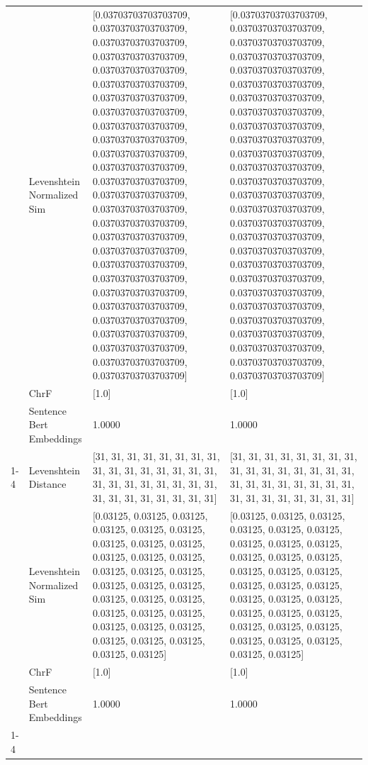 \begin{tabular}{llll}
 & Levenshtein Normalized Sim & [0.03703703703703709, 0.03703703703703709, 0.03703703703703709, 0.03703703703703709, 0.03703703703703709, 0.03703703703703709, 0.03703703703703709, 0.03703703703703709, 0.03703703703703709, 0.03703703703703709, 0.03703703703703709, 0.03703703703703709, 0.03703703703703709, 0.03703703703703709, 0.03703703703703709, 0.03703703703703709, 0.03703703703703709, 0.03703703703703709, 0.03703703703703709, 0.03703703703703709, 0.03703703703703709, 0.03703703703703709, 0.03703703703703709, 0.03703703703703709, 0.03703703703703709, 0.03703703703703709, 0.03703703703703709] & [0.03703703703703709, 0.03703703703703709, 0.03703703703703709, 0.03703703703703709, 0.03703703703703709, 0.03703703703703709, 0.03703703703703709, 0.03703703703703709, 0.03703703703703709, 0.03703703703703709, 0.03703703703703709, 0.03703703703703709, 0.03703703703703709, 0.03703703703703709, 0.03703703703703709, 0.03703703703703709, 0.03703703703703709, 0.03703703703703709, 0.03703703703703709, 0.03703703703703709, 0.03703703703703709, 0.03703703703703709, 0.03703703703703709, 0.03703703703703709, 0.03703703703703709, 0.03703703703703709, 0.03703703703703709] \\
 & ChrF & [1.0] & [1.0] \\
 & Sentence Bert Embeddings & 1.0000 & 1.0000 \\
\cline{1-4}
\multirow[t]{4}{*}{Getaracha nigo gekoiyia amoro ye'nyomba.} & Levenshtein Distance & [31, 31, 31, 31, 31, 31, 31, 31, 31, 31, 31, 31, 31, 31, 31, 31, 31, 31, 31, 31, 31, 31, 31, 31, 31, 31, 31, 31, 31, 31, 31, 31] & [31, 31, 31, 31, 31, 31, 31, 31, 31, 31, 31, 31, 31, 31, 31, 31, 31, 31, 31, 31, 31, 31, 31, 31, 31, 31, 31, 31, 31, 31, 31, 31] \\
 & Levenshtein Normalized Sim & [0.03125, 0.03125, 0.03125, 0.03125, 0.03125, 0.03125, 0.03125, 0.03125, 0.03125, 0.03125, 0.03125, 0.03125, 0.03125, 0.03125, 0.03125, 0.03125, 0.03125, 0.03125, 0.03125, 0.03125, 0.03125, 0.03125, 0.03125, 0.03125, 0.03125, 0.03125, 0.03125, 0.03125, 0.03125, 0.03125, 0.03125, 0.03125] & [0.03125, 0.03125, 0.03125, 0.03125, 0.03125, 0.03125, 0.03125, 0.03125, 0.03125, 0.03125, 0.03125, 0.03125, 0.03125, 0.03125, 0.03125, 0.03125, 0.03125, 0.03125, 0.03125, 0.03125, 0.03125, 0.03125, 0.03125, 0.03125, 0.03125, 0.03125, 0.03125, 0.03125, 0.03125, 0.03125, 0.03125, 0.03125] \\
 & ChrF & [1.0] & [1.0] \\
 & Sentence Bert Embeddings & 1.0000 & 1.0000 \\
\cline{1-4}
\bottomrule
\end{tabular}
